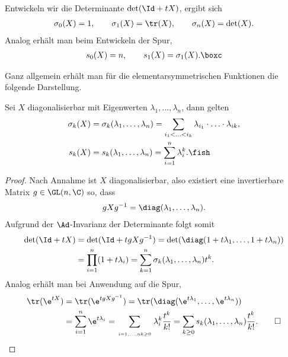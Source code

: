 \documentclass[%
	paper=a5,%
	fleqn,%
	DIV=18,%
	BCOR=0mm,
	fontsize=11pt,
	titlepage=false,%
	bibliography=totoc,
	DIV=18,%
	twoside=true,
	pdftitle=Riemannsche Geometrie,
	pdfauthor=Uwe Semmelmann,
	numbers=noendperiod]%
	{scrbook}
\begin{document}
\begin{ex}
Entwickeln wir die Determinante $\det(\Id+tX)$, ergibt sich 
\begin{align*}
\sigma_0(X) = 1,\qquad \sigma_1(X) = \tr(X),\qquad \sigma_n(X) = \det(X).
\end{align*}
Analog erhält man beim Entwickeln der Spur,
\begin{align*}
s_0(X) = n, \qquad s_1(X) = \sigma_1(X).\boxc
\end{align*}
\end{ex}

Ganz allgemein erhält man für die elementarsymmetrischen Funktionen die folgende
Darstellung.

\begin{lem}
Sei $X$ diagonalisierbar mit Eigenwerten $\lambda_1,\ldots,\lambda_n$, dann
gelten
\begin{align*}
\sigma_k(X) &= \sigma_k(\lambda_1,\ldots,\lambda_n) = \sum_{i_1 < \ldots < i_k}
\lambda_{i_1}\cdot \ldots\cdot \lambda_{ik},\\
s_k(X) &= s_k(\lambda_1,\ldots,\lambda_n) = \sum_{i=1}^n \lambda_i^k.\fish
\end{align*}
\end{lem}
\begin{proof}
Nach Annahme ist $X$ diagonalisierbar, also existiert eine invertierbare Matrix
$g\in \GL(n,\C)$ so, dass
\begin{align*}
gXg^{-1} = \diag(\lambda_1,\ldots,\lambda_n).
\end{align*}
Aufgrund der $\Ad$-Invarianz der Determinante folgt somit
\begin{align*}
\det(\Id + tX) &= \det(\Id + tgXg^{-1}) =
\det(\diag(1+t\lambda_1,\ldots,1+t\lambda_n))\\
&= \prod_{i=1}^n (1+t\lambda_i) = 
\sum_{k=1}^n \sigma_k(\lambda_1,\ldots,\lambda_n)t^k.
\end{align*}
Analog erhält man bei Anwendung auf die Spur,
\begin{align*}
\tr(\e^{tX})&= \tr(\e^{tgXg^{-1}}) = 
\tr(\diag(\e^{t\lambda_1},\ldots,\e^{t\lambda_n}))\\
&= \sum_{i=1}^n \e^{t\lambda_i} = 
\sum_{\atop{i=1,\ldots,n}{k\ge 0}} \lambda_i^k \frac{t^k}{k!}
= \sum_{k\ge 0} s_k(\lambda_1,\ldots,\lambda_n)\frac{t^k}{k!}.\qed
\end{align*}
\end{proof}
\end{document}
